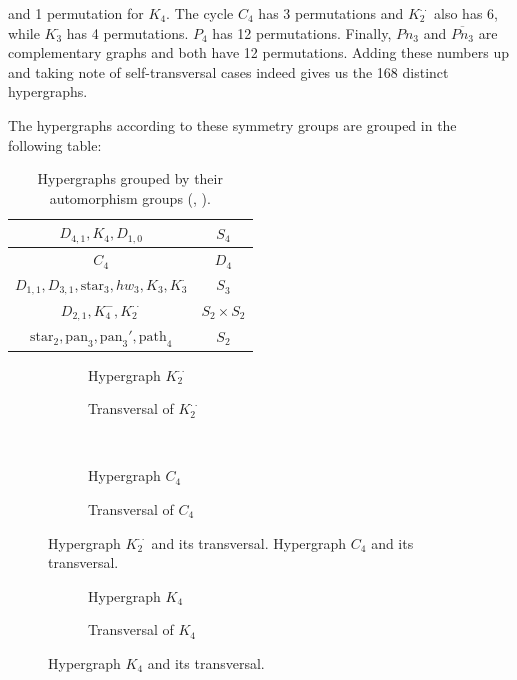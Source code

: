 \noindent and 1 permutation for $K_4$. The cycle $C_4$ has 3 permutations and $K_2^{\cdot\cdot}$ also has 6, while $K_3^{\cdot}$ has 4 permutations. $P_4$ has 12 permutations. Finally, $Pn_3$ and $\overline{Pn_3}$ are complementary graphs and both have 12 permutations. Adding these numbers up and taking note of self-transversal cases indeed gives us the 168 distinct hypergraphs.

The hypergraphs according to these symmetry groups are grouped in the following table:

\begin{table}[h]
\centering
\begin{tabular}{|c|c|}
\hline
$D_{4,1},K_4,D_{1,0}$ & $S_4$\\\hline
$C_4$ & $D_4$\\\hline
$D_{1,1},D_{3,1},\text{star}_3,hw_3,K_3,K_3^{\cdot}$ & $S_3$\\\hline
$D_{2,1},K_4^-,K_2^{\cdot\cdot}$ & $S_2\times S_2$\\\hline
$\text{star}_2,\text{pan}_3,\text{pan}_3',\text{path}_4$ & $S_2$\\\hline
\end{tabular}
\caption{Hypergraphs grouped by their automorphism groups (, ).}
\end{table}

\begin{figure}[tp]
\centering
\begin{subfigure}{0.45\linewidth}\centering\caption{Hypergraph $K_2^{\cdot\cdot}$}\end{subfigure}\hfill
\begin{subfigure}{0.45\linewidth}\centering\caption{Transversal of $K_2^{\cdot\cdot}$}\end{subfigure}\\[8pt]
\begin{subfigure}{0.45\linewidth}\centering\caption{Hypergraph $C_4$}\end{subfigure}\hfill
\begin{subfigure}{0.45\linewidth}\centering\caption{Transversal of $C_4$}\end{subfigure}
\caption{Hypergraph $K_2^{\cdot\cdot}$ and its transversal. Hypergraph $C_4$ and its transversal.}\label{fig:k2dd-c4}
\end{figure}

\begin{figure}[tp]
\centering
\begin{subfigure}{0.45\linewidth}\centering\caption{Hypergraph $K_4$}\end{subfigure}\hfill
\begin{subfigure}{0.45\linewidth}\centering\caption{Transversal of $K_4$}\end{subfigure}
\caption{Hypergraph $K_4$ and its transversal.}\label{fig:k4}
\end{figure}


